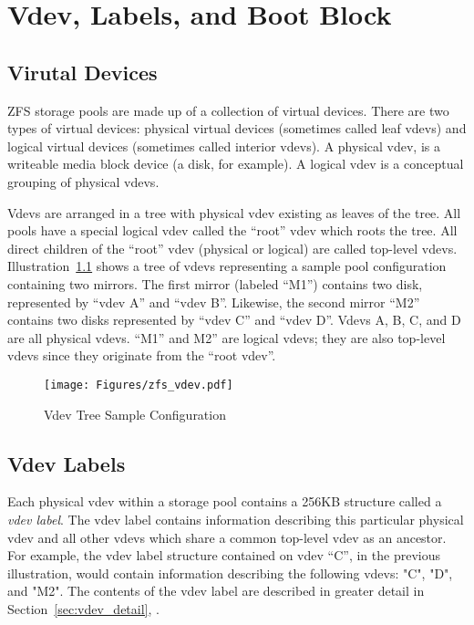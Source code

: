 \chapter{Vdev, Labels, and Boot Block}\label{chap:vdev}

\section{Virutal Devices}

ZFS storage pools are made up of a collection of virtual devices.
There are two types of virtual devices: physical virtual devices
(sometimes called leaf vdevs)
and logical virtual devices
(sometimes called interior vdevs).
A physical vdev,
is a writeable media block device (a disk, for example).
A logical vdev is a conceptual grouping of physical vdevs.

Vdevs are arranged in a tree with physical vdev existing as leaves of the tree.
All pools have a special logical vdev called the “root” vdev
which roots the tree.
All direct children of the “root” vdev (physical or logical) are called top-level vdevs.
Illustration~\ref{fig:vdev_sample} shows a tree of vdevs
representing a sample pool configuration containing two mirrors.
The first mirror (labeled “M1”) contains two disk,
represented by “vdev A” and “vdev B”.
Likewise, the second mirror “M2” contains two disks represented by “vdev C” and “vdev D”.
Vdevs A, B, C, and D are all physical vdevs.
“M1” and M2” are logical vdevs;
they are also top-level vdevs since they originate from the “root vdev”.

\begin{figure}
  \centering
  \texttt{[image: Figures/zfs\_vdev.pdf]}
  \caption{Vdev Tree Sample Configuration}
  \label{fig:vdev_sample}
\end{figure}

\section{Vdev Labels}

Each physical vdev within a storage pool contains a 256KB structure called a \emph{vdev label}.
The vdev label contains information
describing this particular physical vdev and all other vdevs
which share a common top-level vdev as an ancestor.
For example,
the vdev label structure contained on vdev “C”, in the previous illustration,
would contain information
describing the following vdevs:
"C", "D", and "M2".
The contents of the vdev label are described in greater detail
in Section~\ref{sec:vdev_detail},
.

